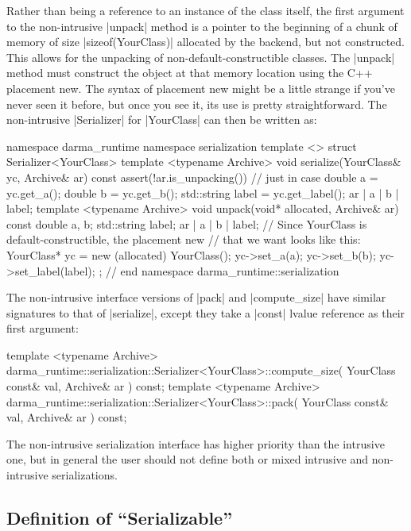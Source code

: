 Rather than being a reference to an instance of the class itself, the first
argument to the non-intrusive |unpack| method is a pointer to the beginning of a
chunk of memory of size |sizeof(YourClass)| allocated by the backend, but not
constructed.  This allows for the unpacking of non-default-constructible
classes.  The |unpack| method must construct the object at that memory
location using the C++ placement new.  The syntax of placement new might be a
little strange if you've never seen it before, but once you see it, its use is
pretty straightforward.  The non-intrusive |Serializer| for |YourClass| can then
be written as:
\begin{CppCodeNumb}
namespace darma_runtime { namespace serialization {
template <>
struct Serializer<YourClass> {
  template <typename Archive>
  void serialize(YourClass& yc, Archive& ar) const {
    assert(!ar.is_unpacking()) // just in case
    double a = yc.get_a();
    double b = yc.get_b();
    std::string label = yc.get_label();
    ar | a | b | label;
  }
  template <typename Archive>
  void unpack(void* allocated, Archive& ar) const {
    double a, b;
    std::string label;
    ar | a | b | label;
    // Since YourClass is default-constructible, the placement new
    // that we want looks like this:
    YourClass* yc = new (allocated) YourClass();
    yc->set_a(a);
    yc->set_b(b);
    yc->set_label(label);
  }
};
}} // end namespace darma_runtime::serialization
\end{CppCodeNumb}
The non-intrusive interface versions of |pack| and |compute_size| have similar
signatures to that of |serialize|, except they take a |const| lvalue reference
as their first argument:
\begin{CppCodeNumb}
template <typename Archive>
darma_runtime::serialization::Serializer<YourClass>::compute_size(
  YourClass const& val, Archive& ar
) const;
template <typename Archive>
darma_runtime::serialization::Serializer<YourClass>::pack(
  YourClass const& val, Archive& ar
) const;
\end{CppCodeNumb}

The non-intrusive serialization interface has higher priority than the intrusive
one, but in general the user should not define both or mixed intrusive and
non-intrusive serializations.

\subsection{Definition of ``Serializable''}


